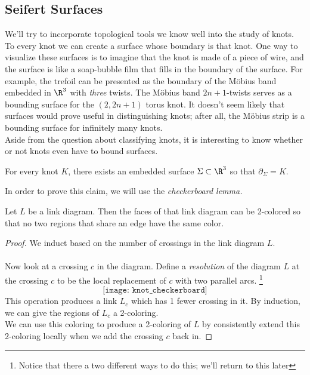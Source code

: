 \subsection{Seifert Surfaces}
We'll try to incorporate topological tools we know well into the study of knots.  To every knot we can create a surface whose boundary is that knot. One way to visualize these surfaces is to imagine that the knot is made of a piece of wire, and the surface is like a soap-bubble film that fills in the boundary of the surface. For example, the trefoil can be presented as the boundary of the M\"obius band embedded in $\R^3$ with \emph{three} twists. The M\"obius band $2n+1$-twists serves as a bounding surface for the $(2, 2n+1)$ torus knot. It doesn't seem likely that surfaces would prove useful in distinguishing knots; after all, the M\"obius strip is a bounding surface for infinitely many knots. \\
Aside from the question about classifying knots, it is interesting to know whether or not knots even have to bound surfaces. 
\begin{claim}
For every knot $K$, there exists an embedded surface $\Sigma\subset \R^3$ so that $\partial_\Sigma= K$. 
\end{claim}
In order to prove this claim, we will use the \emph{checkerboard lemma.}
\begin{lemma}
Let $L$ be a link diagram. Then the faces of that link diagram can be 2-colored so that no two regions that share an edge have the same color. 
\end{lemma}
\begin{proof}
We induct based on the number of crossings in the link diagram $L$.\\
\\
Now look at a crossing $c$ in the diagram. Define a \emph{resolution} of the diagram $L$ at the crossing $c$ to be the local replacement of $c$ with two parallel arcs. \footnote{Notice that there a two different ways to do this; we'll return to this later}  
\[\texttt{[image: knot\_checkerboard]}\] This operation produces a link $L_c$ which has 1 fewer crossing in it. By induction, we can give the regions of $L_c$ a 2-coloring. \\
We can use this coloring to produce a 2-coloring of $L$ by consistently extend this 2-coloring locally when we add the crossing $c$ back in. 
\end{proof}
